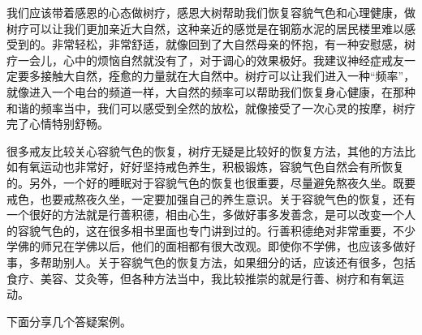 \documentclass{ctexart}
\begin{document}
我们应该带着感恩的心态做树疗，感恩大树帮助我们恢复容貌气色和心理健康，做树疗可以让我们更加亲近大自然，这种亲近的感觉是在钢筋水泥的居民楼里难以感受到的。非常轻松，非常舒适，就像回到了大自然母亲的怀抱，有一种安慰感，树疗一会儿，心中的烦恼自然就没有了，对于调心的效果极好。我建议神经症戒友一定要多接触大自然，痊愈的力量就在大自然中。树疗可以让我们进入一种“频率”，就像进入一个电台的频道一样，大自然的频率可以帮助我们恢复身心健康，在那种和谐的频率当中，我们可以感受到全然的放松，就像接受了一次心灵的按摩，树疗完了心情特别舒畅。

很多戒友比较关心容貌气色的恢复，树疗无疑是比较好的恢复方法，其他的方法比如有氧运动也非常好，好好坚持戒色养生，积极锻炼，容貌气色自然会有所恢复的。另外，一个好的睡眠对于容貌气色的恢复也很重要，尽量避免熬夜久坐。既要戒色，也要戒熬夜久坐，一定要加强自己的养生意识。关于容貌气色的恢复，还有一个很好的方法就是行善积德，相由心生，多做好事多发善念，是可以改变一个人的容貌气色的，这在很多相书里面也专门讲到过的。行善积德绝对非常重要，不少学佛的师兄在学佛以后，他们的面相都有很大改观。即使你不学佛，也应该多做好事，多帮助别人。关于容貌气色的恢复方法，如果细分的话，应该还有很多，包括食疗、美容、艾灸等，但各种方法当中，我比较推崇的就是行善、树疗和有氧运动。

下面分享几个答疑案例。
\end{document}
